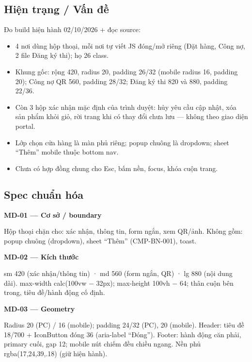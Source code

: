 \documentclass[11pt,a4paper]{report}
\begin{document}
\subsection*{Hiện trạng / Vấn đề}
Đo build hiện hành 02/\allowbreak{}10/\allowbreak{}2026 + đọc source:\par
\begin{itemize}
\item 4 nơi dùng hộp thoại, mỗi nơi tự viết JS đóng/\allowbreak{}mở riêng (Đặt hàng, Công nợ, 2 file Đăng ký thi); họ  26 class.
\item Khung gốc: rộng 420, radius 20, padding 26/\allowbreak{}32 (mobile radius 16, padding 20); Công nợ QR 560, padding 28/\allowbreak{}32; Đăng ký thi 820 và 880, padding 22/\allowbreak{}36.
\item Còn 3 hộp xác nhận mặc định của trình duyệt: hủy yêu cầu cập nhật, xóa sản phẩm khỏi giỏ, rời trang khi có thay đổi chưa lưu — không theo giao diện portal.
\item Lớp chọn cửa hàng là màn phủ riêng; popup chuông là dropdown; sheet “Thêm” mobile thuộc bottom nav.
\item Chưa có hợp đồng chung cho Esc, bấm nền, focus, khóa cuộn trang.
\end{itemize}
\subsection*{Spec chuẩn hóa}
\par\smallskip\textbf{MD-01 — Cơ sở / boundary}\par
Hộp thoại chặn cho: xác nhận, thông tin, form ngắn, xem QR/\allowbreak{}ảnh. Không gồm: popup chuông (dropdown), sheet “Thêm” (CMP-BN-001), toast.\par

\par\smallskip\textbf{MD-02 — Kích thước}\par
sm 420 (xác nhận/\allowbreak{}thông tin) · md 560 (form ngắn, QR) · lg 880 (nội dung dài). max-\allowbreak{}width calc(100vw \(-\) 32px); max-\allowbreak{}height 100vh \(-\) 64; thân cuộn bên trong, tiêu đề/\allowbreak{}hành động cố định.\par

\par\smallskip\textbf{MD-03 — Geometry}\par
Radius 20 (PC) / 16 (mobile); padding 24/\allowbreak{}32 (PC), 20 (mobile). Header: tiêu đề 18/\allowbreak{}700 + IconButton đóng 36 (aria-\allowbreak{}label “Đóng”). Footer: hành động căn phải, primary cuối, gap 12; mobile nút chiếm đều chiều ngang. Nền phủ rgba(17,24,39,.18) (giữ hiện hành).\par
\end{document}
